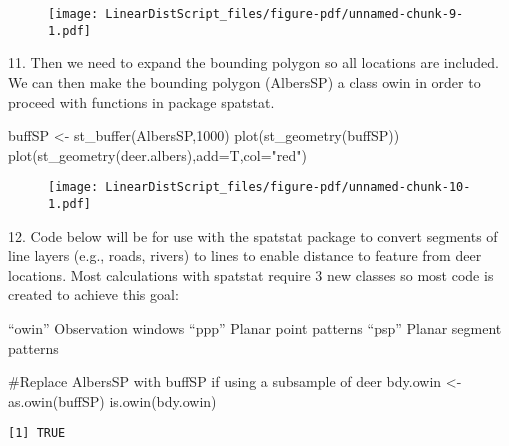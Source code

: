 \documentclass[
  letterpaper,
]{book}
\newenvironment{Shaded}{\begin{snugshade}}{\end{snugshade}}
\newcommand{\AttributeTok}[1]{\textcolor[rgb]{0.40,0.45,0.13}{#1}}
\newcommand{\CommentTok}[1]{\textcolor[rgb]{0.37,0.37,0.37}{#1}}
\newcommand{\DecValTok}[1]{\textcolor[rgb]{0.68,0.00,0.00}{#1}}
\newcommand{\FunctionTok}[1]{\textcolor[rgb]{0.28,0.35,0.67}{#1}}
\newcommand{\NormalTok}[1]{\textcolor[rgb]{0.00,0.23,0.31}{#1}}
\newcommand{\OtherTok}[1]{\textcolor[rgb]{0.00,0.23,0.31}{#1}}
\newcommand{\StringTok}[1]{\textcolor[rgb]{0.13,0.47,0.30}{#1}}
\begin{document}
\begin{figure}[H]

{\centering \texttt{[image: LinearDistScript\_files/figure-pdf/unnamed-chunk-9-1.pdf]}

}

\end{figure}

11. Then we need to expand the bounding polygon so all locations are
included. We can then make the bounding polygon (AlbersSP) a class owin
in order to proceed with functions in package spatstat.

\begin{Shaded}
\begin{Highlighting}[]
\NormalTok{buffSP }\OtherTok{\textless{}{-}} \FunctionTok{st\_buffer}\NormalTok{(AlbersSP,}\DecValTok{1000}\NormalTok{)}
\FunctionTok{plot}\NormalTok{(}\FunctionTok{st\_geometry}\NormalTok{(buffSP))}
\FunctionTok{plot}\NormalTok{(}\FunctionTok{st\_geometry}\NormalTok{(deer.albers),}\AttributeTok{add=}\NormalTok{T,}\AttributeTok{col=}\StringTok{"red"}\NormalTok{)}
\end{Highlighting}
\end{Shaded}

\begin{figure}[H]

{\centering \texttt{[image: LinearDistScript\_files/figure-pdf/unnamed-chunk-10-1.pdf]}

}

\end{figure}

12. Code below will be for use with the spatstat package to convert
segments of line layers (e.g., roads, rivers) to lines to enable
distance to feature from deer locations. Most calculations with spatstat
require 3 new classes so most code is created to achieve this goal:

``owin'' Observation windows ``ppp'' Planar point patterns ``psp''
Planar segment patterns

\begin{Shaded}
\begin{Highlighting}[]
\CommentTok{\#Replace AlbersSP with buffSP if using a subsample of deer}
\NormalTok{bdy.owin }\OtherTok{\textless{}{-}} \FunctionTok{as.owin}\NormalTok{(buffSP)}
\FunctionTok{is.owin}\NormalTok{(bdy.owin)}
\end{Highlighting}
\end{Shaded}

\begin{verbatim}
[1] TRUE
\end{verbatim}
\end{document}
